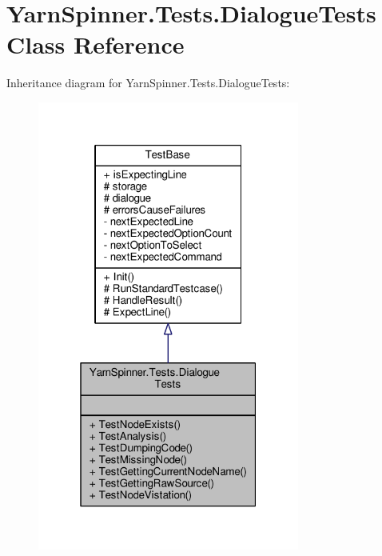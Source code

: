 \hypertarget{a00072}{\section{Yarn\-Spinner.\-Tests.\-Dialogue\-Tests Class Reference}
\label{a00072}
}


Inheritance diagram for Yarn\-Spinner.\-Tests.\-Dialogue\-Tests\-:
\nopagebreak
\begin{figure}[H]
\begin{center}
\leavevmode
\includegraphics[width=244pt]{dc/ddc/a00727}
\end{center}
\end{figure}


